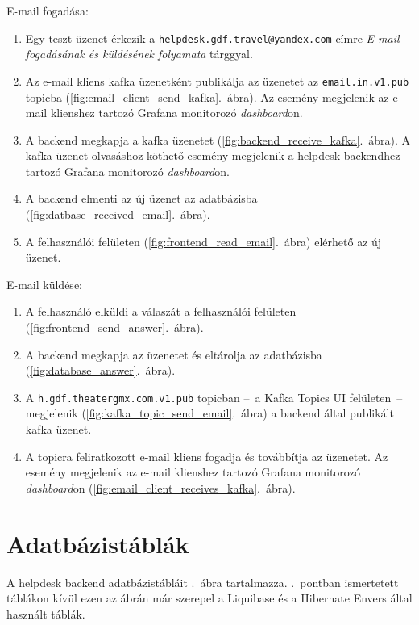 \newpage
E-mail fogadása:
\begin{enumerate}
	\item Egy teszt üzenet érkezik a \href{mailto:helpdesk.gdf.travel@yandex.com}{\nolinkurl{helpdesk.gdf.travel@yandex.com}} címre
	\emph{E-mail fogadásának és küldésének folyamata} tárggyal.
	\item Az e-mail kliens kafka üzenetként publikálja az üzenetet az \texttt{email.in.v1.pub} topicba (\ref{fig:email_client_send_kafka}.~ábra). Az esemény megjelenik az e-mail klienshez tartozó Grafana monitorozó \emph{dashboard}on.
	\item A backend megkapja a kafka üzenetet (\ref{fig:backend_receive_kafka}.~ábra). A kafka üzenet olvasáshoz köthető esemény megjelenik a helpdesk backendhez tartozó Grafana monitorozó \emph{dashboard}on.
	\item A backend elmenti az új üzenet az adatbázisba (\ref{fig:datbase_received_email}.~ábra).
	\item A felhasználói felületen (\ref{fig:frontend_read_email}.~ábra) elérhető az új üzenet.
\end{enumerate}

\bigskip

E-mail küldése:
\begin{enumerate}
	\item A felhasználó elküldi a válaszát a felhasználói felületen (\ref{fig:frontend_send_answer}.~ábra).
	\item A backend megkapja az üzenetet és eltárolja az adatbázisba (\ref{fig:database_answer}.~ábra).
	\item A \texttt{h.gdf.theater\textunderscore gmx.com.v1.pub} topicban --~a Kafka Topics UI felületen~-- megjelenik (\ref{fig:kafka_topic_send_email}.~ábra) a backend által publikált kafka üzenet.
	\item A topicra feliratkozott e-mail kliens fogadja és továbbítja az üzenetet. Az esemény megjelenik az e-mail klienshez tartozó Grafana monitorozó \emph{dashboard}on (\ref{fig:email_client_receives_kafka}.~ábra).
\end{enumerate}
 


\section{Adatbázistáblák}
A helpdesk backend adatbázistábláit .~ábra tartalmazza. .~pontban ismertetett táblákon kívül ezen az ábrán már szerepel a Liquibase és a Hibernate Envers által használt táblák.

